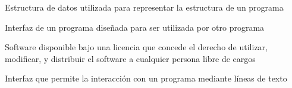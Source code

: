 {Estructura de datos utilizada para representar la estructura de un programa}

{Interfaz de un programa diseñada para ser utilizada por otro programa}

{Software disponible bajo una licencia que concede el derecho de utilizar, modificar, y distribuir el software a cualquier persona libre de cargos}

{Interfaz que permite la interacción con un programa mediante líneas de texto}

